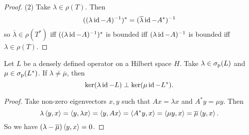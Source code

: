 \begin{proof}
(2) Take $\lambda\in\rho(T)$. Then
\[ ((\lambda\operatorname{id} - A)^{-1})^* = (\overline{\lambda}\operatorname{id} - A^*)^{-1} \]
so $\overline{\lambda}\in\rho(T^*)$ iff $((\lambda\operatorname{id} - A)^{-1})^*$ is bounded iff $(\lambda\operatorname{id} - A)^{-1}$ is bounded iff $\lambda\in \rho(T)$.
\end{proof}

\begin{lemma} \label{eigenspaceOrthogonalAdjoint}
Let $L$ be a densely defined operator on a Hilbert space $H$. Take $\lambda\in \sigma_\text{p}(L)$ and $\mu\in\sigma_\text{p}(L^*)$. If $\lambda \neq \overline{\mu}$, then
\[ \ker(\lambda\operatorname{id} - L)\perp \ker(\mu\operatorname{id} - L^*). \]
\end{lemma}
\begin{proof}
Take non-zero eigenvectors $x,y$ such that $Ax = \lambda x$ and $A^*y = \mu y$. Then
\[ \lambda \left\langle y,x \right\rangle = \left\langle y,\lambda x \right\rangle = \left\langle y, Ax \right\rangle = \left\langle A^*y,x \right\rangle = \left\langle \mu y,x \right\rangle = \overline{\mu}\left\langle y,x \right\rangle. \]
So we have $(\lambda - \overline{\mu})\left\langle y,x \right\rangle = 0$.
\end{proof}

